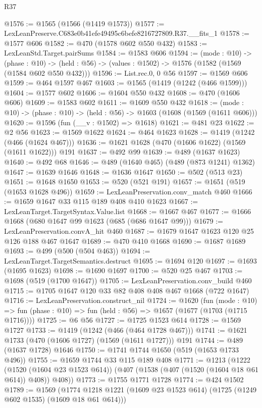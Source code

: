 \begin{lexlean}{R37}
\begin{coremodule}
@1576 := @1565 (@1566 (@1419 @1573))
@1577 := LexLeanPreserve.C683e0b41efe49495c6befe8216727809.R37.__fits_1
@1578 := @1577 @606
@1582 := @470 (@1578 @602 @550 @432)
@1583 := LexLeanStd.Target.pairSums
@1584 := @1583 @606
@1594 := (mode : @10) ->
  (phase : @10) -> (held : @56) -> (values : @1502) -> @1576 (@1582 (@1569 (@1584 @602 @550 @432)))
@1596 := List.rec.{0, 0} @56
@1597 := @1569 @606
@1599 := @464 @1597 @467
@1603 := @1565 (@1419 (@1242 (@466 @1599)))
@1604 := @1577 @602
@1606 := @1604 @550 @432
@1608 := @470 (@1606 @606)
@1609 := @1583 @602
@1611 := @1609 @550 @432
@1618 := (mode : @10) -> (phase : @10) -> (held : @56) -> @1603 (@1608 (@1569 (@1611 @606)))
@1620 := @1596 (fun (__v : @1502) => @1618)
@1621 := @481 @23
@1622 := @2 @56
@1623 := @1569 @1622
@1624 := @464 @1623
@1628 := @1419 (@1242 (@466 (@1624 @467)))
@1636 := @1621 @1628 (@470 (@1606 @1622) (@1569 (@1611 @1622))) @191
@1637 := @492 @99
@1639 := @489 (@1637 @1623)
@1640 := @492 @68
@1646 := @489 (@1640 @465) (@489 (@873 @1241) @1362)
@1647 := @1639 @1646
@1648 := @1636 @1647
@1650 := @502 (@513 @23)
@1651 := @1648 @1650
@1653 := @520 (@521 @191)
@1657 := @1651 (@519 (@1653 @1628 @496))
@1659 := LexLeanPreservation.conv_match @460
@1666 := @1659 @1647 @33 @115 @189 @408 @410 @1623
@1667 := LexLeanTarget.TargetSyntax.Value.list
@1668 := @1667 @467
@1677 := @1666 @1668 (@680 @1647 @99 @1623 (@685 (@686 @1647 @99)))
@1679 := LexLeanPreservation.convA_hit @460
@1687 := @1679 @1647 @1623 @120 @25 @126 @188 @467 @1647
@1689 := @470 @410 @1668
@1690 := @1687 @1689
@1693 := @499 (@500 (@504 @463))
@1694 := LexLeanTarget.TargetSemantics.destruct
@1695 := @1694 @120
@1697 := @1693 (@1695 @1623)
@1698 := @1690 @1697
@1700 := @520 @25 @467
@1703 := @1698 (@519 (@1700 @1647))
@1705 := LexLeanPreservation.conv_build @460
@1715 := @1705 @1647 @120 @33 @82 @408 @408 @467 @1668 (@722 @1647)
@1716 := LexLeanPreservation.construct_nil
@1724 := @1620
    (fun (mode : @10) =>
    fun (phase : @10) => fun (held : @56) => @1657 (@1677 (@1703 (@1715 @1716))))
@1725 := @6 @56
@1727 := @1725 @1523 @614
@1728 := @1569 @1727
@1733 := @1419 (@1242 (@466 (@464 @1728 @467)))
@1741 := @1621 @1733 (@470 (@1606 @1727) (@1569 (@1611 @1727))) @191
@1744 := @489 (@1637 @1728) @1646
@1750 := @1741 @1744 @1650 (@519 (@1653 @1733 @496))
@1755 := @1659 @1744 @33 @115 @189 @408
@1771 := @1213
    (@1222
      (@1520 (@1604 @23 @1523 @614))
      (@407 (@1538 (@407 (@1520 (@1604 @18 @61 @614)) @408)) @408))
@1773 := @1755 @1771 @1728
@1774 := @424 @1502
@1789 := @1569
    (@1774 @1218 @1221 (@1609 @23 @1523 @614) (@1725 (@1249 @602 @1535) (@1609 @18 @61 @614)))

\end{coremodule}
\end{lexlean}

